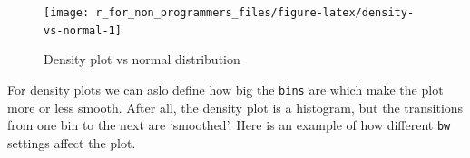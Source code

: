 \documentclass[
]{book}
\newenvironment{Shaded}{\begin{snugshade}}{\end{snugshade}}
\newcommand{\AttributeTok}[1]{\textcolor[rgb]{0.77,0.63,0.00}{#1}}
\newcommand{\CommentTok}[1]{\textcolor[rgb]{0.56,0.35,0.01}{\textit{#1}}}
\newcommand{\DecValTok}[1]{\textcolor[rgb]{0.00,0.00,0.81}{#1}}
\newcommand{\FunctionTok}[1]{\textcolor[rgb]{0.00,0.00,0.00}{#1}}
\newcommand{\NormalTok}[1]{#1}
\newcommand{\OtherTok}[1]{\textcolor[rgb]{0.56,0.35,0.01}{#1}}
\newcommand{\SpecialCharTok}[1]{\textcolor[rgb]{0.00,0.00,0.00}{#1}}
\newcommand{\StringTok}[1]{\textcolor[rgb]{0.31,0.60,0.02}{#1}}
\begin{document}
\begin{Shaded}
\end{Shaded}

\begin{figure}

{\centering \texttt{[image: r\_for\_non\_programmers\_files/figure-latex/density-vs-normal-1]} 

}

\caption{Density plot vs normal distribution}\label{fig:density-vs-normal}
\end{figure}

For density plots we can aslo define how big the \texttt{bins} are which make the plot more or less smooth. After all, the density plot is a histogram, but the transitions from one bin to the next are `smoothed'. Here is an example of how different \texttt{bw} settings affect the plot.
\end{document}
